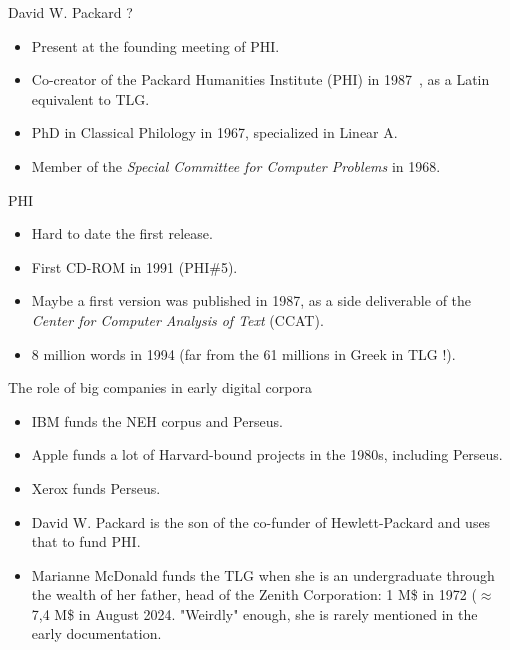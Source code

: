 \documentclass[aspectratio=169]{beamer}
\begin{document}
\begin{frame}{David W. Packard ?}
    \begin{itemize}
        \item Present at the founding meeting of PHI.
        \item Co-creator of the Packard Humanities Institute (PHI) in 1987~\parencite{helgerson_cd-rom_1988}, as a Latin equivalent to TLG.
        \item PhD in Classical Philology in 1967, specialized in Linear A.
        \item Member of the \textit{Special Committee for Computer Problems} in 1968.
    \end{itemize}
\end{frame}

\begin{frame}{PHI}
    \begin{itemize}
        \item Hard to date the first release.
        \item First CD-ROM in 1991 (PHI\#5).
        \item Maybe a first version was published in 1987, as a side deliverable of the \textit{Center for Computer Analysis of Text} (CCAT).
        \item 8 million words in 1994 (far from the 61 millions in Greek in TLG !).
    \end{itemize}
\end{frame}

\begin{frame}{The role of big companies in early digital corpora}
    \begin{itemize}
        \item IBM funds the NEH corpus and Perseus.
        \item Apple funds a lot of Harvard-bound projects in the 1980s, including Perseus.
        \item Xerox funds Perseus.
        \item David W. Packard is the son of the co-funder of Hewlett-Packard and uses that to fund PHI.
        \item Marianne McDonald funds the TLG when she is an undergraduate through the wealth of her father, head of the Zenith Corporation: 1 M\$ in 1972 ($\approx$ 7,4 M\$ in August 2024. "Weirdly" enough, she is rarely mentioned in the early documentation.
    \end{itemize}
\end{frame}
\end{document}
